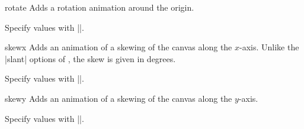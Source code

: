 \begin{sysanimateattribute}{rotate}
    Adds a rotation animation around the origin.

    Specify values with |\pgfsysanimvalscalar|.
\begin{codeexample}[
    preamble={\usetikzlibrary{animations}},
    animation list={0.5,1,1.5,2},
    ]
\end{codeexample}
\end{sysanimateattribute}

\begin{sysanimateattribute}{skewx}
    Adds an animation of a skewing of the canvas along the $x$-axis. Unlike the
    |slant| options of \tikzname, the skew is given in degrees.

    Specify values with |\pgfsysanimvalscalar|.
\begin{codeexample}[
    preamble={\usetikzlibrary{animations}},
    animation list={0.5,1,1.5,2},
]
\end{codeexample}
\end{sysanimateattribute}

\begin{sysanimateattribute}{skewy}
    Adds an animation of a skewing of the canvas along the $y$-axis.

    Specify values with |\pgfsysanimvalscalar|.
\end{sysanimateattribute}

